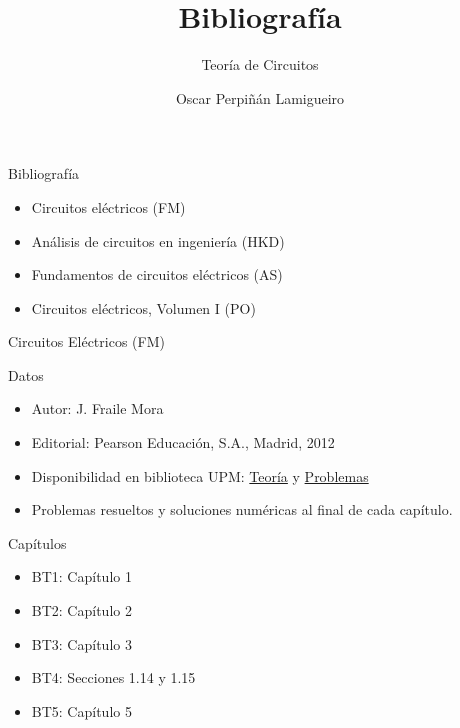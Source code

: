 \documentclass[xcolor={usenames,svgnames,dvipsnames}]{beamer}
\author{Oscar Perpiñán Lamigueiro}
\date{}
\title{Bibliografía}
\subtitle{Teoría de Circuitos}
\begin{document}
\maketitle


\begin{frame}[label={sec:orgc8e5985}]{Bibliografía}
\begin{itemize}
\item Circuitos eléctricos (\alert{FM})
\item Análisis de circuitos en ingeniería (\alert{HKD})
\item Fundamentos de circuitos eléctricos (\alert{AS})
\item Circuitos eléctricos, Volumen I (\alert{PO})
\end{itemize}
\end{frame}


\begin{frame}[label={sec:org7f0504d}]{Circuitos Eléctricos (\alert{FM})}
\begin{block}{Datos}
\begin{itemize}
\item Autor: J. Fraile Mora
\item Editorial: Pearson Educación, S.A., Madrid, 2012
\item Disponibilidad en biblioteca UPM: \href{https://ingenio.upm.es/primo-explore/fulldisplay?docid=34UPM\_ALMA2150534070004212\&context=L\&vid=34UPM\_VU1\&search\_scope=TAB1\_SCOPE1\&tab=tab1\&lang=es\_ES}{Teoría} y \href{https://ingenio.upm.es/permalink/f/1vo0cl5/34UPM\_ALMA2164586310004212}{Problemas}
\item Problemas resueltos y soluciones numéricas al final de cada capítulo.
\end{itemize}
\end{block}

\begin{block}{Capítulos}
\begin{itemize}
\item BT1: Capítulo 1
\item BT2: Capítulo 2
\item BT3: Capítulo 3
\item BT4: Secciones 1.14 y 1.15
\item BT5: Capítulo 5
\end{itemize}
\end{block}
\end{frame}
\end{document}
